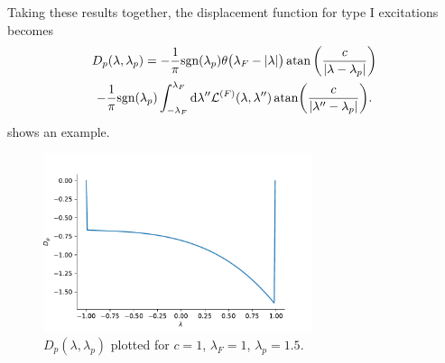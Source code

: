 \documentclass[11pt, a4paper]{report} %
\begin{document}
Taking these results together, the displacement function for type I excitations becomes 
\begin{multline}
	D_p\qty(\lambda, \lambda_p) = - \frac{1}{\pi} \textrm{sgn}\qty(\lambda_p) \theta\qty\big(\lambda_F - \abs{\lambda})  \atan\left(\frac{c}{\abs{\lambda-\lambda_p}}\right) \\-\frac{1}{\pi}\textrm{sgn}\qty(\lambda_p) \int_{-\lambda_F}^{\lambda_F} \dd \lambda''   \mathcal{L}^{(F)}\qty(\lambda,\lambda'') \atan(\frac{c}{\abs{\lambda''-\lambda_p}}).
\end{multline}
 shows an example.
\begin{figure}[tb!]
  \centering
  \includegraphics[width=0.7\textwidth]{dpplot.pdf}
  \caption{$D_p(\lambda,\lambda_p)$ plotted for \(c=1\), \(\lambda_F=1\), \(\lambda_p=1.5\).}\label{fig:dpplot}
\end{figure}
\end{document}
